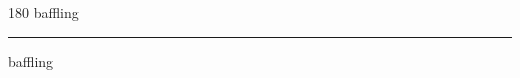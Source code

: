 
\begin{frame}
\begin{center}
\begin{turn}{180}
{\fontsize{2.5cm}{1em}\selectfont baffling}
\end{turn}
\vspace{1em}\par  
\hrule
\vspace{1em}\par  
{\fontsize{2.5cm}{1em}\selectfont baffling}
\end{center}
\end{frame}
